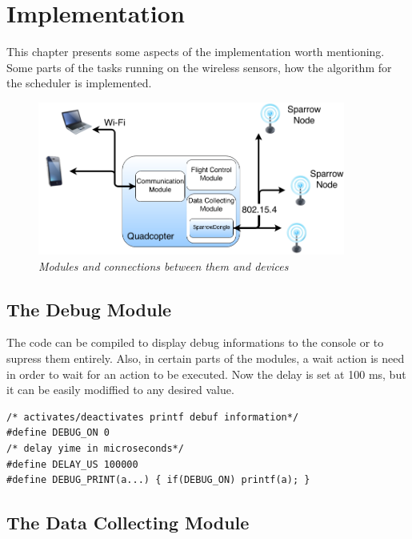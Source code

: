 \normalfont\normalsize
\chapter{Implementation}

This chapter presents some aspects of the implementation worth mentioning. Some parts of the tasks running on the wireless sensors,
how the algorithm for the scheduler is implemented.
 
\begin{figure}[ht]
\begin{center}
\includegraphics[width=0.9\textwidth]{implementation/organigrama.png}
\end{center}
\caption{\small \itshape{Modules and connections between them and devices}}
\end{figure}

\section{The Debug Module}

The code can be compiled to display debug informations to the console or to supress them entirely. Also, in certain parts of the modules, a wait action is need in order to wait for an action to be executed. Now the delay is set at 100 ms, but it can be easily modiffied to any desired value. 

\lstset{numbers=none, mathescape=true, nolol=false,caption=Data Collection use of mutex,label=lst:task}
\begin{lstlisting}
/* activates/deactivates printf debuf information*/
#define DEBUG_ON 0
/* delay yime in microseconds*/
#define DELAY_US 100000
#define DEBUG_PRINT(a...) { if(DEBUG_ON) printf(a); }
\end{lstlisting}

 

\section{The Data Collecting Module}
 

